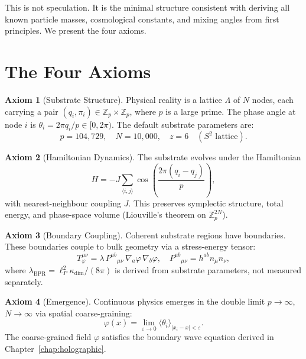 \documentclass[12pt,oneside]{book}
\theoremstyle{definition}
\newtheorem{axiom}{Axiom}[chapter]
\newcommand{\lP}{\ell_P}
\begin{document}
This is not speculation. It is the minimal structure consistent with deriving all
known particle masses, cosmological constants, and mixing angles from first
principles. We present the four axioms.

\section{The Four Axioms}

\begin{axiom}[Substrate Structure]
  \label{ax:substrate}
  Physical reality is a lattice $\Lambda$ of $N$ nodes, each carrying a pair
  $(q_i, \pi_i) \in \mathbb{Z}_p \times \mathbb{Z}_p$, where $p$ is a large prime.
  The phase angle at node $i$ is $\theta_i = 2\pi q_i / p \in [0, 2\pi)$.
  The default substrate parameters are:
  \begin{equation}
    p = 104{,}729, \quad N = 10{,}000, \quad z = 6 \quad (S^2\text{ lattice}).
  \end{equation}
\end{axiom}

\begin{axiom}[Hamiltonian Dynamics]
  \label{ax:hamiltonian}
  The substrate evolves under the Hamiltonian
  \begin{equation}
    \label{eq:substrate-hamiltonian}
    H = -J \sum_{\langle i,j\rangle} \cos\!\left(\frac{2\pi(q_i - q_j)}{p}\right),
  \end{equation}
  with nearest-neighbour coupling $J$. This preserves symplectic structure,
  total energy, and phase-space volume (Liouville's theorem on $\mathbb{Z}_p^{2N}$).
\end{axiom}

\begin{axiom}[Boundary Coupling]
  \label{ax:coupling}
  Coherent substrate regions have boundaries. These boundaries couple to bulk
  geometry via a stress-energy tensor:
  \begin{equation}
    \label{eq:stress-energy-coupling}
    T^{\mu\nu}_\varphi = \lambda\, P^{ab}{}_{\mu\nu}\,\nabla_a\varphi\,\nabla_b\varphi,
    \quad P^{ab}{}_{\mu\nu} = h^{ab} n_\mu n_\nu,
  \end{equation}
  where $\lambda_{\mathrm{BPR}} = \lP^2 \kappa_{\mathrm{dim}}/(8\pi)$ is derived
  from substrate parameters, not measured separately.
\end{axiom}

\begin{axiom}[Emergence]
  \label{ax:emergence}
  Continuous physics emerges in the double limit $p \to \infty$, $N \to \infty$
  via spatial coarse-graining:
  \begin{equation}
    \label{eq:emergence}
    \varphi(x) = \lim_{\varepsilon\to 0} \langle\theta_i\rangle_{|x_i - x| < \varepsilon}.
  \end{equation}
  The coarse-grained field $\varphi$ satisfies the boundary wave equation derived
  in Chapter~\ref{chap:holographic}.
\end{axiom}
\end{document}
